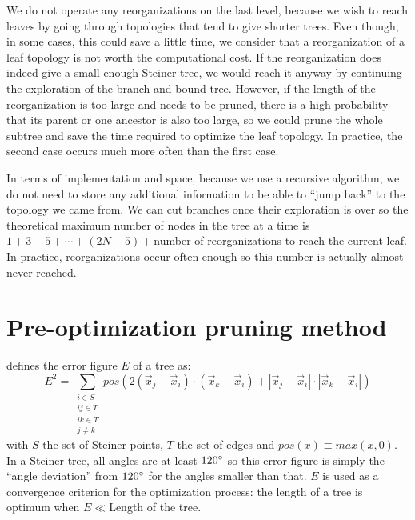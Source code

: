 \documentclass{article}
\theoremstyle{plain}
\begin{document}
We do not operate any reorganizations on the last level, because we wish to reach leaves by going through topologies that tend to give shorter trees. 
Even though, in some cases, this could save a little time, we consider that a reorganization of a leaf topology is not worth the computational cost. 
If the reorganization does indeed give a small enough Steiner tree, we would reach it anyway by continuing the exploration of the \mbox{branch-and-bound} tree. 
However, if the length of the reorganization is too large and needs to be pruned, there is a high probability that its parent or one ancestor is also too large, so we could prune the whole subtree and save the time required to optimize the leaf topology. 
In practice, the second case occurs much more often than the first case. 

In terms of implementation and space, because we use a recursive algorithm, we do not need to store any additional information to be able to ``jump back'' to the topology we came from. 
We can cut branches once their exploration is over so the theoretical maximum number of nodes in the tree at a time is $1 + 3 + 5 + \cdots + (2N-5) + $number of reorganizations to reach the current leaf. 
In practice, reorganizations occur often enough so this number is actually almost never reached.










\FloatBarrier











\section{Pre-optimization pruning method}
\label{sec:pruning}

\cite{Smith} defines the error figure $E$ of a tree as: 
\[E^2 = \sum_{\substack{i \in S\\ ij \in T\\ ik \in T\\ j \neq k}} pos(2(\vec{x}_j - \vec{x}_i) \cdot (\vec{x}_k - \vec{x}_i) + |\vec{x}_j - \vec{x}_i| \cdot |\vec{x}_k - \vec{x}_i|) \]
with $S$ the set of Steiner points, $T$ the set of edges and $pos(x) \equiv max(x,0)$. In a Steiner tree, all angles are at least $120\degree$ so this error figure is simply the ``angle deviation'' from $120\degree$ for the angles smaller than that. $E$ is used as a convergence criterion for the optimization process: the length of a tree is optimum when $E \ll $Length of the tree.
\end{document}
